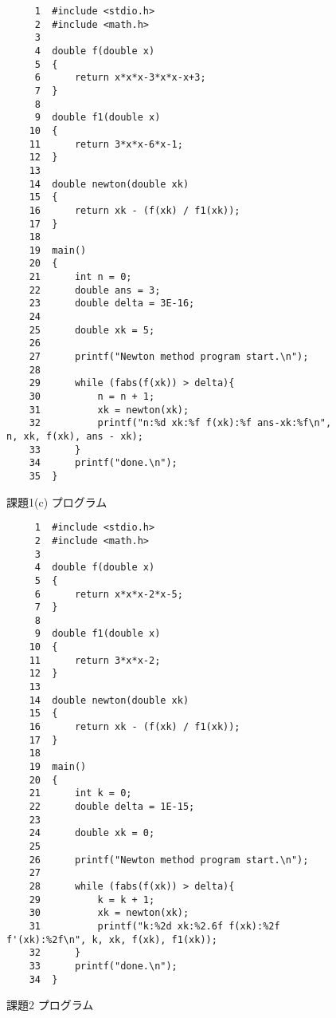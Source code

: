 \documentclass[12pt]{jarticle}
\renewcommand  \[  {\begin{eqnarray}}
\renewcommand  \]  {\end{eqnarray}}
\begin{document}
\begin{figure}[t]
\begin{screen}
\footnotesize
\begin{verbatim}
     1	#include <stdio.h>
     2	#include <math.h> 
     3	
     4	double f(double x)
     5	{
     6	    return x*x*x-3*x*x-x+3;
     7	}
     8	
     9	double f1(double x)
    10	{
    11	    return 3*x*x-6*x-1;
    12	}
    13	
    14	double newton(double xk)
    15	{
    16	    return xk - (f(xk) / f1(xk));
    17	}
    18	
    19	main()
    20	{
    21	    int n = 0;
    22	    double ans = 3;
    23	    double delta = 3E-16;
    24	
    25	    double xk = 5;
    26	
    27	    printf("Newton method program start.\n");
    28	
    29	    while (fabs(f(xk)) > delta){
    30	        n = n + 1;
    31	        xk = newton(xk);
    32	        printf("n:%d xk:%f f(xk):%f ans-xk:%f\n", n, xk, f(xk), ans - xk);
    33	    }
    34	    printf("done.\n");
    35	}
\end{verbatim}
\end{screen}
\caption{課題1(c) プログラム}
\label{fig:p1c}
\end{figure}

\begin{figure}[t]
\begin{screen}
\footnotesize
\begin{verbatim}
     1	#include <stdio.h>
     2	#include <math.h> 
     3	
     4	double f(double x)
     5	{
     6	    return x*x*x-2*x-5;
     7	}
     8	
     9	double f1(double x)
    10	{
    11	    return 3*x*x-2;
    12	}
    13	
    14	double newton(double xk)
    15	{
    16	    return xk - (f(xk) / f1(xk));
    17	}
    18	
    19	main()
    20	{
    21	    int k = 0;
    22	    double delta = 1E-15;
    23	
    24	    double xk = 0;
    25	
    26	    printf("Newton method program start.\n");
    27	
    28	    while (fabs(f(xk)) > delta){
    29	        k = k + 1;
    30	        xk = newton(xk);
    31	        printf("k:%2d xk:%2.6f f(xk):%2f f'(xk):%2f\n", k, xk, f(xk), f1(xk));
    32	    }
    33	    printf("done.\n");
    34	}
\end{verbatim}
\end{screen}
\caption{課題2 プログラム}
\label{fig:p2}
\end{figure}
\end{document}
